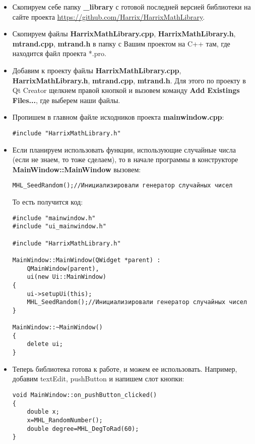 \documentclass[a4paper,12pt]{article}
\begin{document}
\begin{itemize}
\item Скопируем себе папку \textbf{\_library} с готовой последней версией библиотеки на сайте проекта \href{https://github.com/Harrix/HarrixMathLibrary}{https://github.com/Harrix/HarrixMathLibrary}.

\item Скопируем файлы \textbf{HarrixMathLibrary.cpp}, \textbf{HarrixMathLibrary.h}, \textbf{mtrand.cpp}, \textbf{mtrand.h} в папку с Вашим проектом на C++ там, где находится файл проекта *.pro.

\item Добавим к проекту файлы \textbf{HarrixMathLibrary.cpp}, \textbf{HarrixMathLibrary.h}, \textbf{mtrand.cpp}, \textbf{mtrand.h}. Для этого по проекту в Qt Creator щелкнем правой кнопкой и вызовем команду \textbf{Add Existings Files...}, где выберем наши файлы.

\item Пропишем в главном файле исходников проекта \textbf{mainwindow.cpp}:
\begin{lstlisting}[label=install_01_qt,caption=Подключение библиотеки]
#include "HarrixMathLibrary.h"
\end{lstlisting}

\item Если планируем использовать функции, использующие случайные числа (если не знаем, то тоже сделаем), то в начале программы в конструкторе \textbf{MainWindow::MainWindow} вызовем:
\begin{lstlisting}[label=install_02_qt,caption=Инициализация генератора случайных чисел]
MHL_SeedRandom();//Инициализировали генератор случайных чисел
\end{lstlisting}

То есть получится код:
\begin{lstlisting}[label=install_03_qt,caption=Пример файла mainwindow.cpp с подключенной библиотекой]
#include "mainwindow.h"
#include "ui_mainwindow.h"

#include "HarrixMathLibrary.h"

MainWindow::MainWindow(QWidget *parent) :
    QMainWindow(parent),
    ui(new Ui::MainWindow)
{
    ui->setupUi(this);
    MHL_SeedRandom();//Инициализировали генератор случайных чисел    
}

MainWindow::~MainWindow()
{
    delete ui;
}
\end{lstlisting}

\item Теперь библиотека готова к работе, и можем ее использовать. Например, добавим textEdit, pushButton и напишем слот кнопки:
\begin{lstlisting}[label=install_04_qt,caption=Пример использования]
void MainWindow::on_pushButton_clicked()
{
    double x;
    x=MHL_RandomNumber();
    double degree=MHL_DegToRad(60);
}
\end{lstlisting}
\end{itemize}
\end{document}
